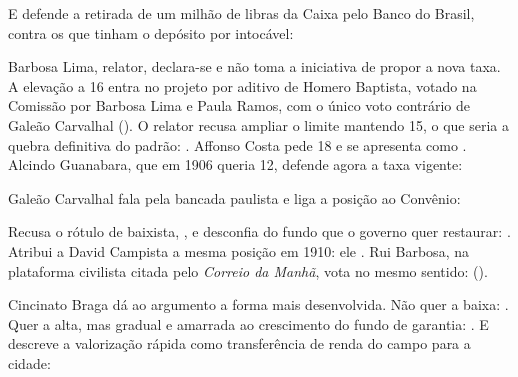 E defende a retirada de um milhão de libras da Caixa pelo Banco do Brasil,
contra os que tinham o depósito por intocável:



Barbosa Lima, relator, declara-se   e não toma a iniciativa de propor a nova taxa.
A elevação a 16 entra no projeto por aditivo de Homero Baptista, votado na
Comissão por Barbosa Lima e Paula Ramos, com o único voto contrário de Galeão
Carvalhal (). O relator
recusa ampliar o limite mantendo 15, o que seria a
quebra definitiva do padrão:  . Affonso Costa pede 18 e se
apresenta como  .
Alcindo Guanabara, que em 1906 queria 12, defende agora a taxa vigente:



Galeão Carvalhal fala pela bancada paulista e liga a posição ao Convênio:


Recusa o rótulo de baixista,  , e desconfia do fundo que
o governo quer restaurar:  . Atribui a David Campista a mesma posição em 1910: ele
 . Rui Barbosa, na plataforma civilista citada pelo
\textit{Correio da Manhã}, vota no mesmo sentido: 
().

Cincinato Braga dá ao argumento a forma mais desenvolvida. Não quer a baixa:
 . Quer a alta, mas
gradual e amarrada ao crescimento do fundo de garantia:  . E descreve a valorização rápida
como transferência de renda do campo para a cidade:

